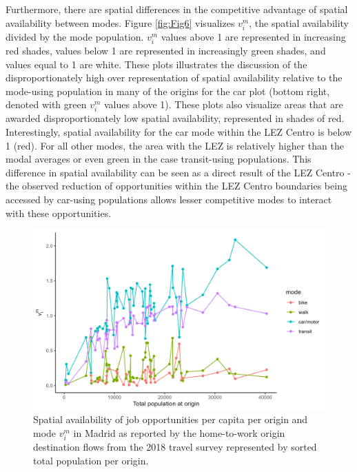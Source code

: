 \documentclass[]{trbunofficial}
\begin{document}
Furthermore, there are spatial differences in the competitive advantage
of spatial availability between modes. Figure \ref{fig:Fig6} visualizes
\(v_i^m\), the spatial availability divided by the mode population.
\(v_i^m\) values above 1 are represented in increasing red shades,
values below 1 are represented in increasingly green shades, and values
equal to 1 are white. These plots illustrates the discussion of the
disproportionately high over representation of spatial availability
relative to the mode-using population in many of the origins for the car
plot (bottom right, denoted with green \(v_i^m\) values above 1). These
plots also visualize areas that are awarded disproportionately low
spatial availability, represented in shades of red. Interestingly,
spatial availability for the car mode within the LEZ Centro is below 1
(red). For all other modes, the area with the LEZ is relatively higher
than the modal averages or even green in the case transit-using
populations. This difference in spatial availability can be seen as a
direct result of the LEZ Centro - the observed reduction of
opportunities within the LEZ Centro boundaries being accessed by
car-using populations allows lesser competitive modes to interact with
these opportunities.

\begin{figure}

{\centering \includegraphics[width=1\linewidth]{images/v_im_per_pop_plot} 

}

\caption{\label{fig:Fig7} Spatial availability of job opportunities per capita per origin and mode $v_i^m$ in Madrid as reported by the home-to-work origin destination flows from the 2018 travel survey represented by sorted total population per origin.}\label{fig:SA-per-capita-m-linear-plot}
\end{figure}
\end{document}
